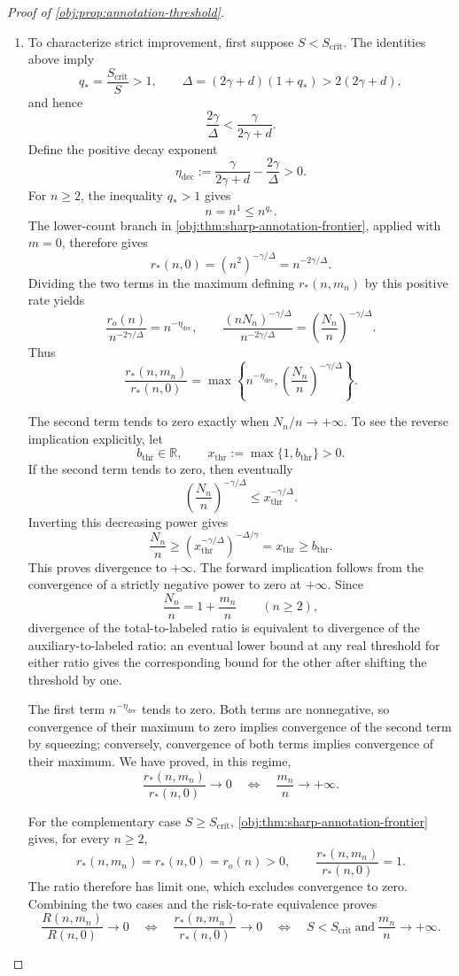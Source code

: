 \documentclass[11pt]{article}
\begin{document}
\begin{proof}[Proof of \cref{obj:prop:annotation-threshold}]
\begin{enumerate}
\item
To characterize strict improvement, first suppose \(S<S_{\mathrm{crit}}\). The identities above imply
\[
q_*=\frac{S_{\mathrm{crit}}}{S}>1,
\qquad
\Delta=(2\gamma+d)(1+q_*)>2(2\gamma+d),
\]
and hence
\[
\frac{2\gamma}{\Delta}<\frac{\gamma}{2\gamma+d}.
\]
Define the positive decay exponent
\[
\eta_{\mathrm{dec}}
:=\frac{\gamma}{2\gamma+d}-\frac{2\gamma}{\Delta}>0.
\]
For \(n\ge2\), the inequality \(q_*>1\) gives
\[
n=n^1\le n^{q_*}.
\]
The lower-count branch in
\cref{obj:thm:sharp-annotation-frontier}, applied with \(m=0\), therefore gives
\[
r_*(n,0)=(n^2)^{-\gamma/\Delta}
=n^{-2\gamma/\Delta}.
\]
Dividing the two terms in the maximum defining \(r_*(n,m_n)\) by this positive rate yields
\[
\frac{r_o(n)}{n^{-2\gamma/\Delta}}
=n^{-\eta_{\mathrm{dec}}},
\qquad
\frac{(nN_n)^{-\gamma/\Delta}}{n^{-2\gamma/\Delta}}
=\left(\frac{N_n}{n}\right)^{-\gamma/\Delta}.
\]
Thus
\[
\frac{r_*(n,m_n)}{r_*(n,0)}
=
\max\left\{
n^{-\eta_{\mathrm{dec}}},
\left(\frac{N_n}{n}\right)^{-\gamma/\Delta}
\right\}.
\]

The second term tends to zero exactly when \(N_n/n\to+\infty\). To see the reverse implication explicitly, let
\[
b_{\mathrm{thr}}\in\mathbb R,
\qquad
x_{\mathrm{thr}}:=\max\{1,b_{\mathrm{thr}}\}>0.
\]
If the second term tends to zero, then eventually
\[
\left(\frac{N_n}{n}\right)^{-\gamma/\Delta}
\le x_{\mathrm{thr}}^{-\gamma/\Delta}.
\]
Inverting this decreasing power gives
\[
\frac{N_n}{n}
\ge
\left(x_{\mathrm{thr}}^{-\gamma/\Delta}\right)^{-\Delta/\gamma}
=x_{\mathrm{thr}}
\ge b_{\mathrm{thr}}.
\]
This proves divergence to \(+\infty\). The forward implication follows from the convergence of a strictly negative power to zero at \(+\infty\). Since
\[
\frac{N_n}{n}=1+\frac{m_n}{n}\qquad(n\ge2),
\]
divergence of the total-to-labeled ratio is equivalent to divergence of the auxiliary-to-labeled ratio: an eventual lower bound at any real threshold for either ratio gives the corresponding bound for the other after shifting the threshold by one.

The first term \(n^{-\eta_{\mathrm{dec}}}\) tends to zero. Both terms are nonnegative, so convergence of their maximum to zero implies convergence of the second term by squeezing; conversely, convergence of both terms implies convergence of their maximum. We have proved, in this regime,
\[
\frac{r_*(n,m_n)}{r_*(n,0)}\longrightarrow0
\quad\Longleftrightarrow\quad
\frac{m_n}{n}\longrightarrow+\infty.
\]

For the complementary case \(S\ge S_{\mathrm{crit}}\),
\cref{obj:thm:sharp-annotation-frontier} gives, for every \(n\ge2\),
\[
r_*(n,m_n)=r_*(n,0)=r_o(n)>0,
\qquad
\frac{r_*(n,m_n)}{r_*(n,0)}=1.
\]
The ratio therefore has limit one, which excludes convergence to zero. Combining the two cases and the risk-to-rate equivalence proves
\[
\frac{R(n,m_n)}{R(n,0)}\longrightarrow0
\quad\Longleftrightarrow\quad
\frac{r_*(n,m_n)}{r_*(n,0)}\longrightarrow0
\quad\Longleftrightarrow\quad
S<S_{\mathrm{crit}}
\ \text{and}\ 
\frac{m_n}{n}\longrightarrow+\infty.
\]


\end{enumerate}
\end{proof}
\end{document}
